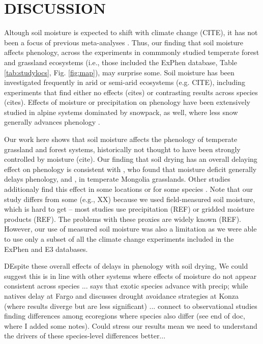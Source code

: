 \documentclass{article}
\begin{document}
\section* {DISCUSSION}

\par Altough soil moisture is expected to shift with climate change (CITE), it has not been a focus of previous meta-analyses  \cite[e.g.,][]{wolkovich2012}. Thus, our finding that soil moisture affects phenology, across the experiments in commmonly studied temperate forest and grassland ecosystems (i.e., those included the ExPhen database, Table \ref{tab:studylocs}, Fig. \ref{fig:map}), may surprise some. Soil moisture has been investigated frequently in arid or semi-arid ecosystems (e.g. CITE), including experiments that find either no effects (cites) or contrasting results across species (cites). Effects of moisture or precipitation on phenology have been extensively studied in alpine systems dominated by snowpack, as well, where less snow generally advances phenology \citep[e.g.,][]{dunne2004,sherwood2017}. 
\par Our work here shows that soil moisture affects the phenology of temperate grassland and forest systems, historically not thought to have been strongly controlled by moisture (cite). Our finding that soil drying has an overall delaying effect on phenology is consistent with \citet{seyed2018}, who found that moisture deficit generally delays phenology, and  \citet{tao2020}, in temperate Mongolia grasslands. Other studies additionaly find this effect in some locations \citep{wang2022} or for some species \citep{tao2019}. Note that our study differs from some (e.g., XX) because we used field-measured soil moisture, which is hard to get -- most studies use precipitation (REF) or gridded moisture products (REF). The problems with these proxies are widely known (REF). However, our use of measured soil moisture was also a limitation as we were able to use only a subset of all the climate change experiments included in the ExPhen and E3 databases. 
\par DEspite these overall effects of delays in phenology with soil drying, 
We could suggest this is in line with other systems where effects of moisture do not appear consistent across species ... \cite{wolkovich2012} says that exotic species advance with precip; while natives delay at Fargo and discusses drought avoidance strategies at Konza (where results diverge but are less significant) ... connect to observational studies finding differences among ecoregions where species also differ (see end of doc, where I added some notes). Could stress our results mean we need to understand the drivers of these species-level differences better...
\end{document}
